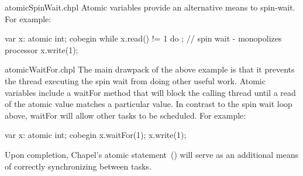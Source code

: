\begin{chapelexample}{atomicSpinWait.chpl}
Atomic variables provide an alternative means to spin-wait.
For example:

\begin{chapel}
var x: atomic int;
cobegin {
  while x.read() != 1 do ;  // spin wait - monopolizes processor
  x.write(1);
}
\end{chapel}
\begin{chapeloutput}
\end{chapeloutput}

\end{chapelexample}


\begin{chapelexample}{atomicWaitFor.chpl}
The main drawpack of the above example is that it prevents the thread
executing the spin wait from doing other useful work. Atomic variables
include a waitFor method that will block the calling thread until a read
of the atomic value matches a particular value. In contrast to the spin
wait loop above, waitFor will allow other tasks to be scheduled. For
example:

\begin{chapel}
var x: atomic int;
cobegin {
  x.waitFor(1);
  x.write(1);
}
\end{chapel}
\begin{chapeloutput}
\end{chapeloutput}

\end{chapelexample}


\begin{future}
Upon completion, Chapel's atomic statement~() will serve as
an additional means of correctly synchronizing between tasks.
\end{future}

